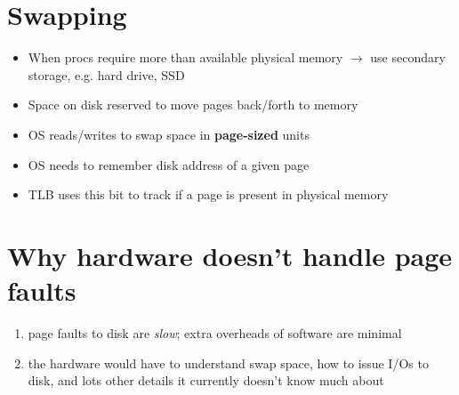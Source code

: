 \documentclass[8pt,a4paper,landscape]{extarticle}
\begin{document}
\pagestyle{empty}

\begin{multicols*}{3}
% 
% 
% 
% 

% 
% 
% 
% 

\section*{Swapping}
\begin{itemize}
\item When procs require more than available physical memory $\to$ use secondary storage, e.g. hard drive, SSD
\item Space on disk reserved to move pages back/forth to memory
\item OS reads/writes to swap space in \textbf{page-sized} units
\item OS needs to remember disk address of a given page
\item TLB uses this bit to track if a page is present in physical memory
\end{itemize}
\section*{Why hardware doesn't handle page faults}
\begin{enumerate}
\item page faults to disk are \emph{slow}; extra overheads of software are minimal
\item the hardware would have to understand swap space, how to issue I/Os to disk, and lots other details it currently doesn't know much about
\end{enumerate}

\end{multicols*}
\end{document}
